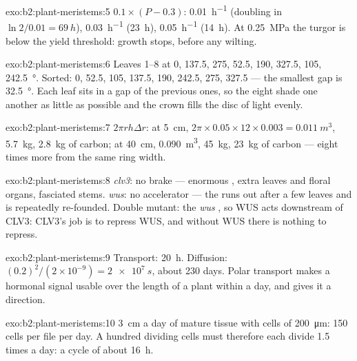 \begin{solution}{exo:b2:plant-meristems:5}
$0.1\times(P - 0.3)$: \qty{0.01}{h^{-1}} (doubling in $\ln 2/0.01 =
\qty{69}{h}$), \qty{0.03}{h^{-1}} (\qty{23}{h}), \qty{0.05}{h^{-1}}
(\qty{14}{h}). At \qty{0.25}{MPa} the turgor is below the yield
threshold: growth stops, before any wilting.
\end{solution}

\begin{solution}{exo:b2:plant-meristems:6}
Leaves 1--8 at 0, 137.5, 275, 52.5, 190, 327.5, 105, \qty{242.5}{\degree}.
Sorted: 0, 52.5, 105, 137.5, 190, 242.5, 275, 327.5 --- the smallest
gap is \qty{32.5}{\degree}. Each leaf sits in a gap of the previous
ones, so the eight shade one another as little as possible and the
crown fills the disc of light evenly.
\end{solution}

\begin{solution}{exo:b2:plant-meristems:7}
$2\pi r h\Delta r$: at \qty{5}{cm}, $2\pi\times 0.05\times 12\times
0.003 = \qty{0.011}{m^3}$, \qty{5.7}{kg}, \qty{2.8}{kg} of carbon; at
\qty{40}{cm}, \qty{0.090}{m^3}, \qty{45}{kg}, \qty{23}{kg} of carbon
--- eight times more from the same ring width.
\end{solution}

\begin{solution}{exo:b2:plant-meristems:8}
\emph{clv3}: no brake --- enormous , extra leaves and floral
organs, fasciated stems. \emph{wus}: no accelerator --- the 
runs out after a few leaves and is repeatedly re-founded. Double
mutant: the \emph{wus} , so WUS acts downstream of CLV3:
CLV3's job is to repress WUS, and without WUS there is nothing to
repress.
\end{solution}

\begin{solution}{exo:b2:plant-meristems:9}
Transport: \qty{20}{h}. Diffusion: $(0.2)^{2}/(2\times 10^{-9}) =
\qty{2e7}{s}$, about 230 days. Polar transport makes a hormonal
signal usable over the length of a plant within a day, and gives
it a direction.
\end{solution}

\begin{solution}{exo:b2:plant-meristems:10}
\qty{3}{cm} a day of mature tissue with cells of \qty{200}{\micro m}:
\num{150} cells per file per day. A hundred dividing cells must
therefore each divide 1.5 times a day: a cycle of about \qty{16}{h}.
\end{solution}

